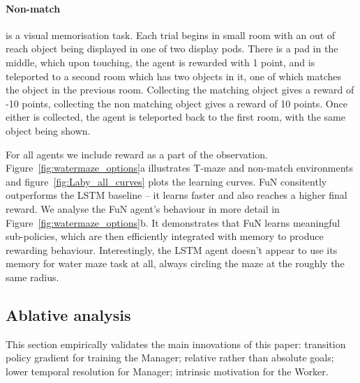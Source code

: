 \parskiny
\paragraph{Non-match} is a visual memorisation task. Each trial begins in small room with an out of reach object being displayed in one of two display pods. There is a pad in the middle, which upon touching, the agent is rewarded with 1 point, and is teleported to a second room which has two objects in it, one of which matches the object in the previous room. Collecting the matching object gives a reward of -10 points, collecting the non matching object gives a reward of 10 points. Once either is collected, the agent is teleported back to the first room, with the same object being shown.

For all agents we include reward as a part of the observation.
Figure~\ref{fig:watermaze_options}a illustrates T-maze and non-match environments and 
figure~\ref{fig:Laby_all_curves} plots the learning curves. FuN consitently outperforms the LSTM baseline -- it learns faster and also reaches a higher final reward. We analyse the FuN agent's behaviour in more detail in Figure~\ref{fig:watermaze_options}b. It demonstrates that FuN learns meaningful sub-policies, which are then efficiently integrated with memory to produce rewarding behaviour. Interestingly, the LSTM agent doesn't appear to use its memory for water maze task at all, always circling the maze at the roughly the same radius. 

\subseckiny
\subsection{Ablative analysis}
\subseckiny
\label{subsec:ablative}


This section empirically validates the main innovations of this paper: transition policy gradient for training the Manager; relative rather than absolute goals; lower temporal resolution for Manager; intrinsic motivation for the Worker.


